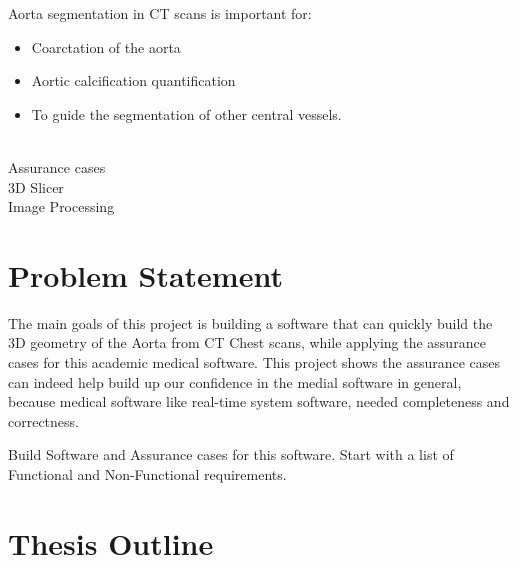 Aorta segmentation in CT scans is important for:
\begin{itemize}
\item Coarctation of the aorta
\item Aortic calcification quantification
\item To guide the segmentation of other central vessels. 
\end{itemize} ~\\
Assurance cases\\
3D Slicer\\
Image Processing\\

\section{Problem Statement} \label{ps}
The main goals of this project is building a software that can quickly build the 3D geometry of the Aorta from CT Chest scans, while applying the assurance cases for this academic medical software. This project shows the assurance cases can indeed help build up our confidence in the medial software in general, because medical software like real-time system software, needed completeness and correctness.

Build Software and Assurance cases for this software.
Start with a list of Functional and Non-Functional requirements.

\section{Thesis Outline} \label{TO}
